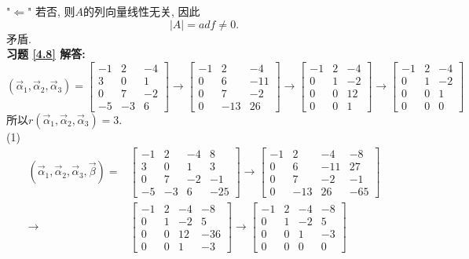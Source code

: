 \documentclass[a4paper]{book}
\begin{document}
"$\Leftarrow$" 若否, 则$A$的列向量线性无关, 因此$$|A|=adf\not=0.$$ 矛盾.\\
\textbf{习题 \ref{4.8} 解答:}\\
$$(\vec{\alpha}_1, \vec{\alpha}_2,\vec{\alpha}_3)=\begin{bmatrix}-1&2&-4\\ 3&0&1\\ 0&7&-2\\-5&-3&6\end{bmatrix}
\rightarrow \begin{bmatrix}-1&2&-4\\ 0&6&-11\\ 0&7&-2\\0&-13&26\end{bmatrix}
\rightarrow \begin{bmatrix}-1&2&-4\\ 0&1&-2\\ 0&0&12\\0&0&1\end{bmatrix}
\rightarrow \begin{bmatrix}-1&2&-4\\ 0&1&-2\\ 0&0&1\\0&0&0\end{bmatrix}$$
所以$r(\vec{\alpha}_1,\vec{\alpha}_2,\vec{\alpha}_3)=3$.\\
(1)\begin{displaymath}\begin{aligned}(\vec{\alpha}_1, \vec{\alpha}_2,\vec{\alpha}_3,\vec{\beta})=&\begin{bmatrix}-1&2&-4&8\\ 3&0&1&3\\ 0&7&-2&-1\\-5&-3&6&-25\end{bmatrix}
\rightarrow \begin{bmatrix}-1&2&-4&-8\\ 0&6&-11&27\\ 0&7&-2&-1\\0&-13&26&-65\end{bmatrix}\\
\rightarrow &\begin{bmatrix}-1&2&-4&-8\\ 0&1&-2&5\\ 0&0&12&-36\\0&0&1&-3\end{bmatrix}
\rightarrow \begin{bmatrix}-1&2&-4&-8\\ 0&1&-2&5\\ 0&0&1&-3\\0&0&0&0\end{bmatrix}\end{aligned}\end{displaymath}
\end{document}

